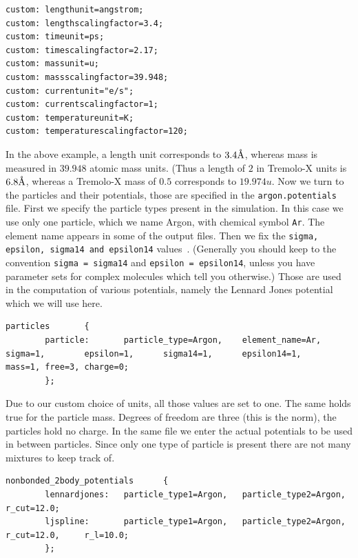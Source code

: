 \begin{lstlisting}
custom: lengthunit=angstrom;
custom: lengthscalingfactor=3.4;
custom: timeunit=ps;
custom: timescalingfactor=2.17;
custom: massunit=u;
custom: massscalingfactor=39.948;
custom: currentunit="e/s";
custom: currentscalingfactor=1;
custom: temperatureunit=K;
custom: temperaturescalingfactor=120;
\end{lstlisting}
In the above example,
a length unit corresponds to $3.4 \text{\normalfont\AA}$, whereas mass is measured in $39.948$ atomic mass units. (Thus a length of $2$ in Tremolo-X units is $6.8\text{\normalfont\AA}$, whereas a
Tremolo-X mass of $0.5$ corresponds to $19.974u$.
\bigbreak
Now we turn to the particles and their potentials, those are specified in the \texttt{argon.potentials} file.
First we specify the particle types present in the simulation. In this case we use only one particle, which we name Argon, with chemical symbol \texttt{Ar}. The element name
appears in some of the output files. Then we fix the \texttt{sigma, epsilon, sigma14 and epsilon14} values~\cite{ArgonLJ1987}. (Generally you should keep to the convention \texttt{sigma = sigma14} and \texttt{epsilon = epsilon14}, unless you have parameter sets for complex molecules which tell you otherwise.) Those are used in the computation of various potentials, namely the
Lennard Jones potential which we will use here.
\begin{lstlisting}
particles       {
        particle:       particle_type=Argon,    element_name=Ar,        sigma=1,        epsilon=1,      sigma14=1,      epsilon14=1,    mass=1, free=3, charge=0;
        };
\end{lstlisting}
Due to our custom choice of units, all those values are set to one.
The same holds true for the particle mass. Degrees of freedom are three (this is the norm), the particles hold no charge.
In the same file we enter the actual potentials to be used in between particles. Since only one type of particle is present there are not many mixtures to keep track of.

\begin{lstlisting}
nonbonded_2body_potentials      {
        lennardjones:   particle_type1=Argon,   particle_type2=Argon,   r_cut=12.0;
        ljspline:       particle_type1=Argon,   particle_type2=Argon,   r_cut=12.0,     r_l=10.0;
        };
\end{lstlisting}

